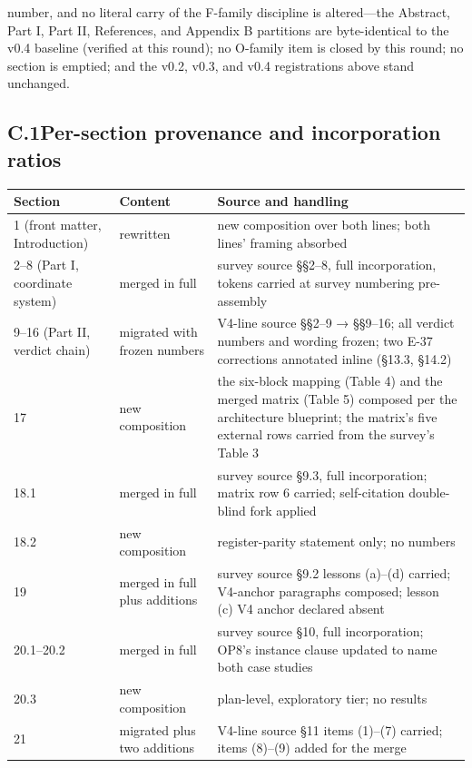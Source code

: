 \documentclass[11pt]{article}
\begin{document}
number, and no literal carry of the F-family discipline is altered—the Abstract, Part I, Part II, References, and Appendix B partitions are byte-identical to the v0.4 baseline (verified at this round); no O-family item is closed by this round; no section is emptied; and the v0.2, v0.3, and v0.4 registrations above stand unchanged.\par
\subsection*{C.1\quad Per-section provenance and incorporation ratios}
\begingroup
\footnotesize\setlength{\LTcapwidth}{\textwidth}
\begin{longtable}{@{}l p{} >{\raggedright\arraybackslash}p{}@{}}
\toprule
\textbf{Section} & \textbf{Content} & \textbf{Source and handling} \\
\midrule
1 (front matter, Introduction) & rewritten & new composition over both lines; both lines' framing absorbed \\
2–8 (Part I, coordinate system) & merged in full & survey source §§2–8, full incorporation, tokens carried at survey numbering pre-assembly \\
9–16 (Part II, verdict chain) & migrated with frozen numbers & V4-line source §§2–9 → §§9–16; all verdict numbers and wording frozen; two E-37 corrections annotated inline (§13.3, §14.2) \\
17 & new composition & the six-block mapping (Table 4) and the merged matrix (Table 5) composed per the architecture blueprint; the matrix's five external rows carried from the survey's Table 3 \\
18.1 & merged in full & survey source §9.3, full incorporation; matrix row 6 carried; self-citation double-blind fork applied \\
18.2 & new composition & register-parity statement only; no numbers \\
19 & merged in full plus additions & survey source §9.2 lessons (a)–(d) carried; V4-anchor paragraphs composed; lesson (c) V4 anchor declared absent \\
20.1–20.2 & merged in full & survey source §10, full incorporation; OP8's instance clause updated to name both case studies \\
20.3 & new composition & plan-level, exploratory tier; no results \\
21 & migrated plus two additions & V4-line source §11 items (1)–(7) carried; items (8)–(9) added for the merge \\

\end{longtable}
\end{document}
